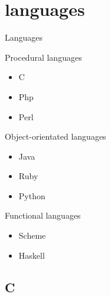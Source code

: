 \documentclass[10pt]{beamer}
\begin{document}
\section{languages}

\begin{frame}{Languages}

	\begin{block}{Procedural languages}
		\begin{itemize}
			\item C
			\item Php
			\item Perl
		\end{itemize}
	\end{block}

	\begin{block}{Object-orientated languages}
		\begin{itemize}
			\item Java
			\item Ruby
			\item Python
		\end{itemize}
	\end{block}

	\begin{block}{Functional languages}
		\begin{itemize}
			\item Scheme
			\item Haskell
		\end{itemize}
	\end{block}

\end{frame}

\subsection{C}
\end{document}
